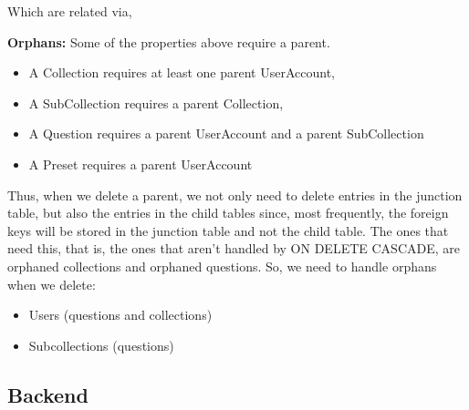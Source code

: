 \documentclass{article}
\begin{document}
Which are related via,
\begin{center}
\end{center}

\textbf{Orphans:} Some of the properties above require a parent.
\begin{itemize}
    \item A Collection requires at least one parent UserAccount,
    \item A SubCollection requires a parent Collection,
    \item A Question requires a parent UserAccount and a parent SubCollection
    \item A Preset requires a parent UserAccount
\end{itemize}
Thus, when we delete a parent, we not only need to delete entries in the junction table, but also the entries in the child tables since, most frequently, the foreign keys will be stored in the junction table and not the child table. The ones that need this, that is, the ones that aren't handled by ON DELETE CASCADE, are orphaned collections and orphaned questions. So, we need to handle orphans when we delete:
\begin{itemize}
    \item Users (questions and collections)
    \item Subcollections (questions)
\end{itemize}


\subsection{Backend}
\end{document}
